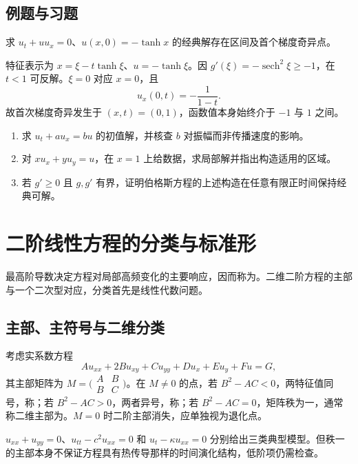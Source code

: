 \documentclass[UTF8,12pt,a4paper,fontset=fandol]{ctexbook}
\begin{document}
\section{例题与习题}
\begin{example}
求 $u_t+u u_x=0$、$u(x,0)=-\tanh x$ 的经典解存在区间及首个梯度奇异点。
\end{example}
\begin{solve}
特征表示为 $x=\xi-t\tanh\xi$、$u=-\tanh\xi$。因 $g'(\xi)=-\operatorname{sech}^2\xi\ge-1$，在 $t<1$ 可反解。$\xi=0$ 对应 $x=0$，且
\[
 u_x(0,t)=-\frac1{1-t}.
\]
故首次梯度奇异发生于 $(x,t)=(0,1)$，函数值本身始终介于 $-1$ 与 $1$ 之间。
\end{solve}
\begin{enumerate}
 \item 求 $u_t+a u_x=b u$ 的初值解，并核查 $b$ 对振幅而非传播速度的影响。
 \item 对 $x u_x+y u_y=u$，在 $x=1$ 上给数据，求局部解并指出构造适用的区域。
 \item 若 $g'\ge0$ 且 $g,g'$ 有界，证明伯格斯方程的上述构造在任意有限正时间保持经典可解。
\end{enumerate}

\chapter{二阶线性方程的分类与标准形}
\label{chap:classification}

最高阶导数决定方程对局部高频变化的主要响应，因而称为。二维二阶方程的主部与一个二次型对应，分类首先是线性代数问题。

\section{主部、主符号与二维分类}
考虑实系数方程
\begin{equation}
 A u_{xx}+2B u_{xy}+C u_{yy}+D u_x+E u_y+F u=G,
 \label{eq:second-order-general}
\end{equation}
其主部矩阵为 $M=\bigl(\begin{smallmatrix}A&B\\B&C\end{smallmatrix}\bigr)$。在 $M\ne0$ 的点，若 $B^2-AC<0$，两特征值同号，称；若 $B^2-AC>0$，两者异号，称；若 $B^2-AC=0$，矩阵秩为一，通常称二维主部为。$M=0$ 时二阶主部消失，应单独视为退化点。

$u_{xx}+u_{yy}=0$、$u_{tt}-c^2u_{xx}=0$ 和 $u_t-\kappa u_{xx}=0$ 分别给出三类典型模型。但秩一的主部本身不保证方程具有热传导那样的时间演化结构，低阶项仍需检查。
\end{document}
